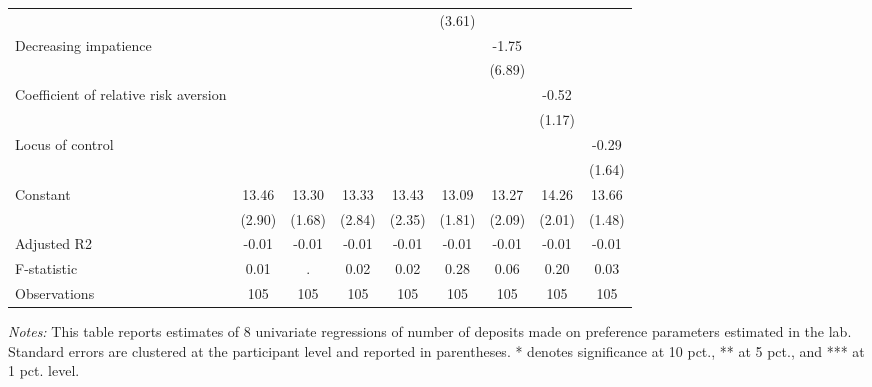 \begin{table}[ht]
{\begin{threeparttable}
\begin{tabular}{l*{8}{c}}
                &                  &                  &                  &                  &   (3.61)         &                  &                  &                  \\
Decreasing impatience&                  &                  &                  &                  &                  &    -1.75         &                  &                  \\
                &                  &                  &                  &                  &                  &   (6.89)         &                  &                  \\
Coefficient of relative risk aversion&                  &                  &                  &                  &                  &                  &    -0.52         &                  \\
                &                  &                  &                  &                  &                  &                  &   (1.17)         &                  \\
Locus of control&                  &                  &                  &                  &                  &                  &                  &    -0.29         \\
                &                  &                  &                  &                  &                  &                  &                  &   (1.64)         \\
Constant        &    13.46\sym{***}&    13.30\sym{***}&    13.33\sym{***}&    13.43\sym{***}&    13.09\sym{***}&    13.27\sym{***}&    14.26\sym{***}&    13.66\sym{***}\\
                &   (2.90)         &   (1.68)         &   (2.84)         &   (2.35)         &   (1.81)         &   (2.09)         &   (2.01)         &   (1.48)         \\
\midrule
Adjusted R2     &    -0.01         &    -0.01         &    -0.01         &    -0.01         &    -0.01         &    -0.01         &    -0.01         &    -0.01         \\
F-statistic     &     0.01         &        .         &     0.02         &     0.02         &     0.28         &     0.06         &     0.20         &     0.03         \\
Observations    &      105         &      105         &      105         &      105         &      105         &      105         &      105         &      105         \\
\bottomrule \end{tabular} \begin{tablenotes}[flushleft] \footnotesize \item \emph{Notes:} This table reports estimates of 8 univariate regressions of number of deposits made on preference parameters estimated in the lab. Standard errors are clustered at the participant level and reported in parentheses. * denotes significance at 10 pct., ** at 5 pct., and *** at 1 pct. level. \end{tablenotes} \end{threeparttable} } \end{table}

